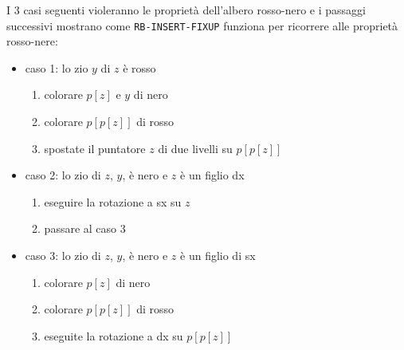 I 3 casi seguenti violeranno le proprietà dell'albero rosso-nero e i passaggi successivi mostrano come \verb|RB-INSERT-FIXUP| funziona per ricorrere alle proprietà rosso-nere:
\begin{itemize}
    \item caso 1: lo zio $y$ di $z$ è rosso
    \begin{enumerate}
        \item colorare $p[z]$ e $y$ di nero
        \item colorare $p[p[z]]$ di rosso
        \item spostate il puntatore $z$ di due livelli su $p[p[z]]$
    \end{enumerate}
    \item caso 2: lo zio di $z$, $y$, è nero e $z$ è un figlio dx
    \begin{enumerate}
        \item eseguire la rotazione a sx su $z$
        \item passare al caso 3
    \end{enumerate}
    \item caso 3: lo zio di $z$, $y$, è nero e $z$ è un figlio di sx
    \begin{enumerate}
        \item colorare $p[z]$ di nero
        \item colorare $p[p[z]]$ di rosso
        \item eseguite la rotazione a dx su $p[p[z]]$
    \end{enumerate}
\end{itemize}

